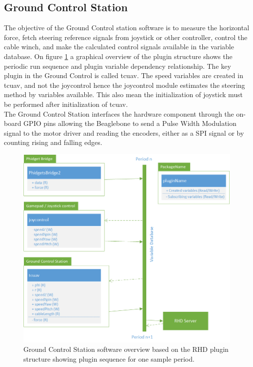 \subsection{Ground Control Station}
The objective of the Ground Control station software is to measure the horizontal force, fetch steering reference signals from joystick or other controller, control the cable winch, and make the calculated control signals available in the variable database. On figure \ref{fig:GCS-software-overview} a graphical overview of the plugin structure shows the periodic run sequence and plugin variable dependency relationship. The key plugin in the Ground Control is called tcuav. The speed variables are created in tcuav, and not the joycontrol hence the joycontrol module estimates the steering method by variables available. This also mean the initialization of joystick must be performed after initialization of tcuav. \\
\noindent
The Ground Control Station interfaces the hardware component through the on-board GPIO pins allowing the Beaglebone to send a Pulse Width Modulation signal to the motor driver and reading the encoders, either as a SPI signal or by counting rising and falling edges.


\begin{figure}[hbtp]
\centering
\includegraphics[scale=0.8]{graphics/Visio/GCS-software-overview.png}
\caption[Ground Control Station software overview]{Ground Control Station software overview based on the RHD plugin structure showing plugin sequence for one sample period.}
\label{fig:GCS-software-overview}
\end{figure}




